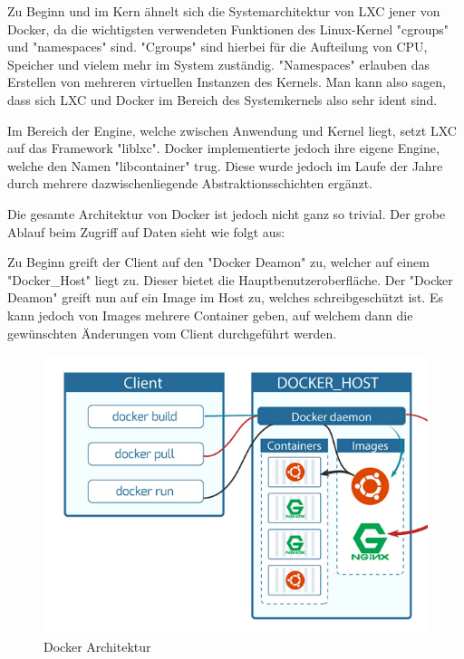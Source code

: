 

Zu Beginn und im Kern ähnelt sich die Systemarchitektur von LXC jener von Docker, da die wichtigsten verwendeten Funktionen des Linux-Kernel "cgroups" und "namespaces" sind. "Cgroups" sind hierbei für die Aufteilung von CPU, Speicher und vielem mehr im System zuständig. "Namespaces" erlauben das Erstellen von mehreren virtuellen Instanzen des Kernels. Man kann also sagen, dass sich LXC und Docker im Bereich des Systemkernels also sehr ident sind. \cite{LxcVsDocker}

Im Bereich der Engine, welche zwischen Anwendung und Kernel liegt, setzt LXC auf das Framework "liblxc". Docker implementierte jedoch ihre eigene Engine, welche den Namen "libcontainer" trug. Diese wurde jedoch im Laufe der Jahre durch mehrere dazwischenliegende Abstraktionsschichten ergänzt. \cite{LxcVsDocker}

Die gesamte Architektur von Docker ist jedoch nicht ganz so trivial. Der grobe Ablauf beim Zugriff auf Daten sieht wie folgt aus:

Zu Beginn greift der Client auf den "Docker Deamon" zu, welcher auf einem "Docker\_Host" liegt zu. Dieser bietet die Hauptbenutzeroberfläche. Der "Docker Deamon" greift nun auf ein Image im Host zu, welches schreibgeschützt ist. Es kann jedoch von Images mehrere Container geben, auf welchem dann die gewünschten Änderungen vom Client durchgeführt werden. \cite{LxcVsDocker}

\begin{figure}[H]
    \centering
    \includegraphics{media/DockerAndContainering/DockerArchitektur.png}
    \caption{Docker Architektur \cite{LxcVsDocker}}
\end{figure}

